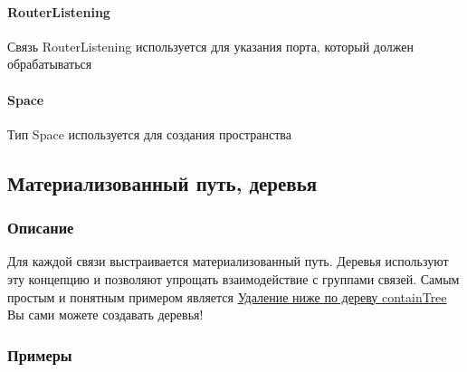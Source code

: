 \documentclass{article}
\begin{document}
\paragraph*{RouterListening}\hypertarget{Core.RouterListening.Description}{}
Связь RouterListening используется для
указания порта, который должен обрабатываться
\paragraph*{Space}\hypertarget{Core.Space.Description}{}
Тип Space используется для создания пространства

\subsection{Материализованный путь, деревья}
\subsubsection{Описание}
Для каждой связи выстраивается материализованный путь. Деревья используют эту
концепцию и позволяют упрощать взаимодействие с группами связей.
Самым простым и понятным примером является
\hyperlink{containTree.Deletion.Example}{Удаление ниже по дереву containTree}
Вы сами можете создавать деревья!
\subsubsection{Примеры}
\end{document}
